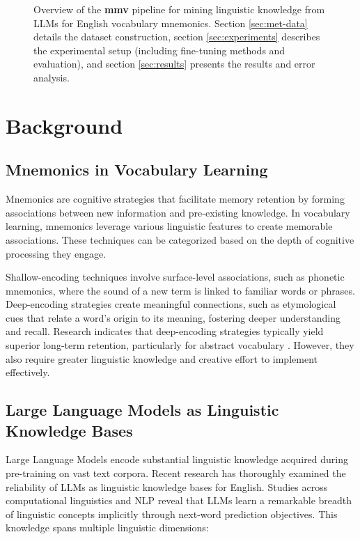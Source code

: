 \documentclass{article}
\newcommand{\shorttitle}{\textbf{mmv }}
\begin{document}
\begin{figure}
  \centering
  
  \caption{Overview of the \shorttitle pipeline for mining linguistic knowledge from LLMs for English vocabulary mnemonics. Section \ref{sec:met-data} details the dataset construction, section \ref{sec:experiments} describes the experimental setup (including fine-tuning methods and evaluation), and section \ref{sec:results} presents the results and error analysis.}
  \label{fig:pipeline}
\end{figure}

\section{Background} \label{sec:background}
\subsection{Mnemonics in Vocabulary Learning} \label{sec:mnemonics}
Mnemonics are cognitive strategies that facilitate memory retention by forming associations between new information and pre-existing knowledge. In vocabulary learning, mnemonics leverage various linguistic features to create memorable associations. These techniques can be categorized based on the depth of cognitive processing they engage.

Shallow-encoding techniques involve surface-level associations, such as phonetic mnemonics, where the sound of a new term is linked to familiar words or phrases. Deep-encoding strategies create meaningful connections, such as etymological cues that relate a word's origin to its meaning, fostering deeper understanding and recall. Research indicates that deep-encoding strategies typically yield superior long-term retention, particularly for abstract vocabulary \citep{craik1975depth, atkinson1975mnemotechnics, oxford1990language}. However, they also require greater linguistic knowledge and creative effort to implement effectively.

\subsection{Large Language Models as Linguistic Knowledge Bases} \label{sec:llm-linguistics}

Large Language Models encode substantial linguistic knowledge acquired during pre-training on vast text corpora. Recent research has thoroughly examined the reliability of LLMs as linguistic knowledge bases for English. Studies across computational linguistics and NLP reveal that LLMs learn a remarkable breadth of linguistic concepts implicitly through next-word prediction objectives. This knowledge spans multiple linguistic dimensions:
\end{document}
